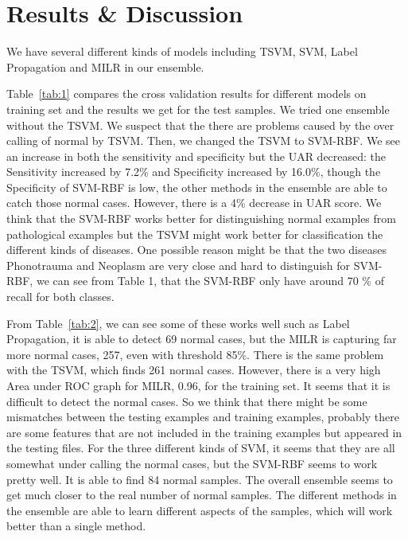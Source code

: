 \section{Results \& Discussion}


We have several different kinds of models including TSVM, SVM, Label Propagation and MILR in our ensemble. 

Table~\ref{tab:1} compares the cross validation results for different models on training set and the results we get for the test samples. We tried one ensemble without the TSVM. We suspect that the there are problems caused by the over calling of normal by TSVM. Then, we changed the TSVM to SVM-RBF. We see an increase in both the sensitivity and specificity but the UAR decreased: the Sensitivity increased by 7.2\% and Specificity increased by 16.0\%, though the Specificity of SVM-RBF is low, the other methods in the ensemble are able to catch those normal cases. However, there is a 4\% decrease in UAR score. We think that the SVM-RBF works better for distinguishing normal examples from pathological examples but the TSVM might work better for classification the different kinds of diseases. One possible reason might be that the two diseases Phonotrauma and Neoplasm are very close and hard to distinguish for SVM-RBF, we can see from Table 1, that the SVM-RBF only have around 70 \% of recall for both classes.

From Table~\ref{tab:2}, we can see some of these works well such as Label Propagation, it is able to detect 69 normal cases, but the MILR is capturing far more normal cases, 257, even with threshold 85\%. There is the same problem with the TSVM, which finds 261 normal cases. However, there is a very high Area under ROC graph for MILR, 0.96, for the training set. It seems that it is difficult to detect the normal cases. So we think that there might be some mismatches between the testing examples and training examples, probably there are some features that are not included in the training examples but appeared in the testing files. For the three different kinds of SVM, it seems that they are all somewhat under calling the normal cases, but the SVM-RBF seems to work pretty well. It is able to find 84 normal samples. The overall ensemble seems to get much closer to the real number of normal samples. The different methods in the ensemble are able to learn different aspects of the samples, which will work better than a single method.


